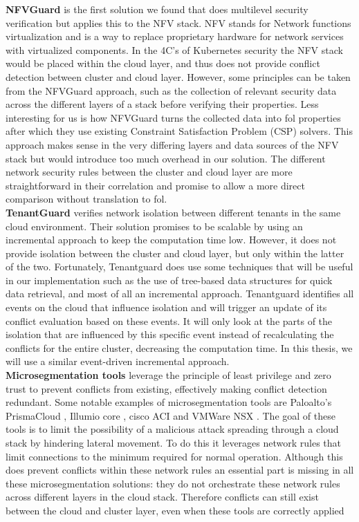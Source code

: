 \textbf{NFVGuard} \cite{nfvguard} is the first solution we found that does multilevel security verification but applies this to the NFV stack. NFV stands for Network functions virtualization and is a way to replace proprietary hardware for network services with virtualized components. In the 4C's of Kubernetes security the NFV stack would be placed within the cloud layer, and thus does not provide conflict detection between cluster and cloud layer. However, some principles can be taken from the NFVGuard approach, such as the collection of relevant security data across the different layers of a stack before verifying their properties. Less interesting for us is how NFVGuard turns the collected data into \acrfull{fol} properties after which they use existing Constraint Satisfaction Problem (CSP) solvers. This approach makes sense in the very differing layers and data sources of the NFV stack but would introduce too much overhead in our solution. The different network security rules between the cluster and cloud layer are more straightforward in their correlation and promise to allow a more direct comparison without translation to \acrshort{fol}.
\\[10pt]

\textbf{TenantGuard} \cite{tenantguard} verifies network isolation between different tenants in the same cloud environment. Their solution promises to be scalable by using an incremental approach to keep the computation time low. However, it does not provide isolation between the cluster and cloud layer, but only within the latter of the two. Fortunately, Tenantguard does use some techniques that will be useful in our implementation such as the use of tree-based data structures for quick data retrieval, and most of all an incremental approach. Tenantguard identifies all events on the cloud that influence isolation and will trigger an update of its conflict evaluation based on these events. It will only look at the parts of the isolation that are influenced by this specific event instead of recalculating the conflicts for the entire cluster, decreasing the computation time. In this thesis, we will use a similar event-driven incremental approach.
\\[10pt]

\textbf{Microsegmentation tools} leverage the principle of least privilege \cite{leastprivilige} and zero trust \cite{trust} to prevent conflicts from existing, effectively making conflict detection redundant. Some notable examples of microsegmentation tools are Paloalto's PrismaCloud \cite{prismacloud}, Illumio core \cite{illumio}, cisco ACI \cite{ciscoaci} and VMWare NSX \cite{vmwarensx}. The goal of these tools is to limit the possibility of a malicious attack spreading through a cloud stack by hindering lateral movement. To do this it leverages network rules that limit connections to the minimum required for normal operation. Although this does prevent conflicts within these network rules an essential part is missing in all these microsegmentation solutions: they do not orchestrate these network rules across different layers in the cloud stack. Therefore conflicts can  still exist between the cloud and cluster layer, even when these tools are correctly applied 

